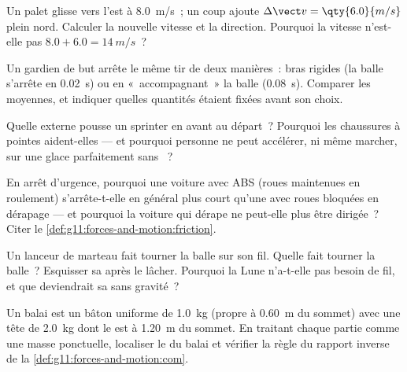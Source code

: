\begin{exercise}[$\star\star$]\label{exo:g11:forces-and-motion:7}
Un palet glisse vers l'est à \qty{8.0}{m/s}~; un coup ajoute
$\Delta \vect v = \qty{6.0}{m/s}$ plein nord. Calculer la nouvelle
vitesse et la direction. Pourquoi la vitesse n'est-elle pas
$8.0 + 6.0 = \qty{14}{m/s}$~?
\end{exercise}

\begin{exercise}[$\star\star$]\label{exo:g11:forces-and-motion:8}
Un gardien de but arrête le même tir de deux manières~: bras rigides
(la balle s'arrête en \qty{0.02}{s}) ou en «~accompagnant~» la balle
(\qty{0.08}{s}). Comparer les 
moyennes, et indiquer quelles quantités étaient fixées avant son
choix.
\end{exercise}

\begin{exercise}[$\star\star$]\label{exo:g11:forces-and-motion:9}
Quelle  externe pousse un sprinter en
avant au départ~? Pourquoi les chaussures à pointes aident-elles --- et
pourquoi personne ne peut accélérer, ni même marcher, sur une glace
parfaitement sans ~?
\end{exercise}

\begin{exercise}[$\star\star$]\label{exo:g11:forces-and-motion:10}
En arrêt d'urgence, pourquoi une voiture avec ABS (roues maintenues en
roulement) s'arrête-t-elle en général plus court qu'une avec roues
bloquées en dérapage --- et pourquoi la voiture qui dérape ne peut-elle
plus être dirigée~? Citer le
\cref{def:g11:forces-and-motion:friction}.
\end{exercise}

\begin{exercise}[$\star\star$]\label{exo:g11:forces-and-motion:11}
Un lanceur de marteau fait tourner la balle sur son fil. Quelle
 fait tourner la balle~? Esquisser sa
 après le lâcher. Pourquoi la Lune n'a-t-elle pas besoin de
fil, et que deviendrait sa  sans gravité~?
\end{exercise}

\begin{exercise}[$\star\star\star$]\label{exo:g11:forces-and-motion:12}
Un balai est un bâton uniforme de \qty{1.0}{kg} (propre
 à \qty{0.60}{m} du sommet)
avec une tête de \qty{2.0}{kg} dont le
 est à \qty{1.20}{m} du
sommet. En traitant chaque partie comme une masse ponctuelle, localiser
le  du balai et vérifier la
règle du rapport inverse de la
\cref{def:g11:forces-and-motion:com}.
\end{exercise}

